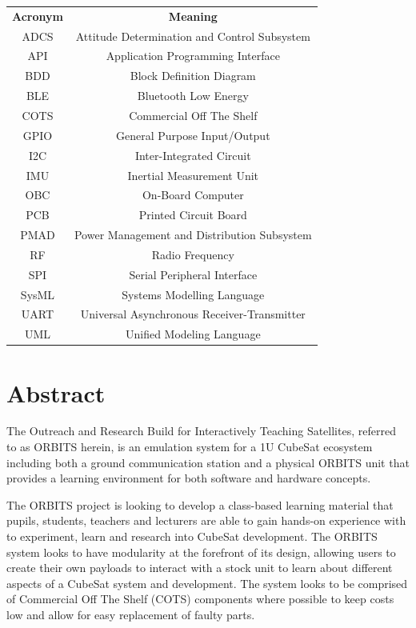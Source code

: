 \documentclass[a4paper,12pt,titlepage]{report}
\begin{document}
\begin{table}[h]
    \centering
    \begin{tabular}{|c|c|}
    \hline
    \textbf{Acronym}&\textbf{Meaning}\\
    ADCS & Attitude Determination and Control Subsystem \\
    API & Application Programming Interface \\
    BDD & Block Definition Diagram \\
    BLE & Bluetooth Low Energy \\
    COTS & Commercial Off The Shelf \\
    GPIO & General Purpose Input/Output \\
    I2C & Inter-Integrated Circuit \\
    IMU & Inertial Measurement Unit \\
    OBC & On-Board Computer \\
    PCB & Printed Circuit Board \\
    PMAD & Power Management and Distribution Subsystem \\
    RF & Radio Frequency \\
    SPI & Serial Peripheral Interface \\
    SysML & Systems Modelling Language \\
    UART & Universal Asynchronous Receiver-Transmitter \\
    UML & Unified Modeling Language \\
    \hline
    \end{tabular}
\end{table}
\chapter{Abstract}
The Outreach and Research Build for Interactively Teaching Satellites, referred to as ORBITS herein, is an emulation system for a 1U CubeSat ecosystem including both a ground communication station and a physical ORBITS unit that provides a learning environment for both software and hardware concepts.

The ORBITS project is looking to develop a class-based learning material that pupils, students, teachers and lecturers are able to gain hands-on experience with to experiment, learn and research into CubeSat development. The ORBITS system looks to have modularity at the forefront of its design, allowing users to create their own payloads to interact with a stock unit to learn about different aspects of a CubeSat system and development. The system looks to be comprised of Commercial Off The Shelf (COTS) components where possible to keep costs low and allow for easy replacement of faulty parts.
\end{document}
